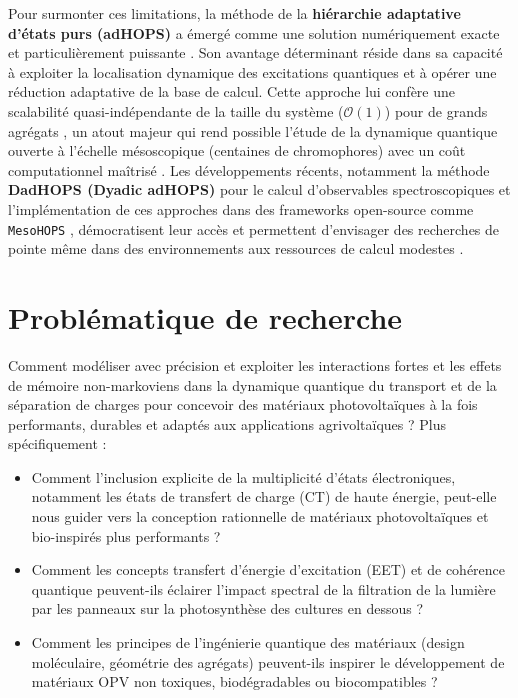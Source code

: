 \documentclass[12pt, a4paper]{article}
\begin{document}
Pour surmonter ces limitations, la méthode de la \textbf{hiérarchie adaptative d'états purs (adHOPS)} a émergé comme une solution numériquement exacte et particulièrement puissante \cite{Suess2014}. Son avantage déterminant réside dans sa capacité à exploiter la localisation dynamique des excitations quantiques et à opérer une réduction adaptative de la base de calcul. Cette approche lui confère une scalabilité quasi-indépendante de la taille du système ($\mathcal{O}(1)$) pour de grands agrégats \cite{varvelo2021, Citty2024}, un atout majeur qui rend possible l'étude de la dynamique quantique ouverte à l'échelle mésoscopique (centaines de chromophores) avec un coût computationnel maîtrisé \cite{zheng2021}. Les développements récents, notamment la méthode \textbf{DadHOPS (Dyadic adHOPS)} pour le calcul d'observables spectroscopiques \cite{Gera2023, Chen2022a} et l'implémentation de ces approches dans des frameworks open-source comme \texttt{MesoHOPS} \cite{Citty2024}, démocratisent leur accès et permettent d'envisager des recherches de pointe même dans des environnements aux ressources de calcul modestes \cite{johansson2012}.

\section{Problématique de recherche}

Comment modéliser avec précision et exploiter les interactions fortes et les effets de mémoire non-markoviens dans la dynamique quantique du transport et de la séparation de charges pour concevoir des matériaux photovoltaïques à la fois performants, durables et adaptés aux applications agrivoltaïques ? Plus spécifiquement :
\begin{itemize}
\item Comment l'inclusion explicite de la multiplicité d'états électroniques, notamment les états de transfert de charge (CT) de haute énergie, peut-elle nous guider vers la conception rationnelle de matériaux photovoltaïques et bio-inspirés plus performants ?
\item Comment les concepts transfert d'énergie d'excitation (EET) et de cohérence quantique peuvent-ils éclairer l'impact spectral  de la filtration de la lumière par les panneaux sur la photosynthèse des cultures en dessous ?
\item Comment les principes de l'ingénierie quantique des matériaux (design moléculaire, géométrie des agrégats) peuvent-ils inspirer le développement de matériaux OPV non toxiques, biodégradables ou biocompatibles ?
\end{itemize}
\end{document}

